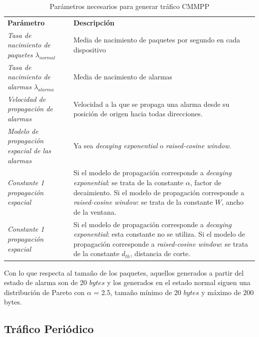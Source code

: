 \begin{table}
    \caption{Parámetros necesarios para generar tráfico CMMPP}
    \label{tab:ParametrosTraficoCMMPP}
    \centering
    \begin{tabular}{|m{6cm}|p{10cm}|} \\ 
    \textbf{Parámetro} & \textbf{Descripción} \\ 
    \textit{Tasa de nacimiento de paquetes $\lambda_{normal}$}  & \footnotesize{ Media de nacimiento de paquetes por segundo en cada dispositivo } \\ \hline 
    \textit{Tasa de nacimiento de alarmas $\lambda_{alarma}$}  & \footnotesize{ Media de nacimiento de alarmas } \\ \hline 
    \textit{Velocidad de propagación de alarmas}  & \footnotesize{ Velocidad a la que se propaga una alarma desde su posición de origen hacia todas direcciones. } \\ \hline 
    \textit{Modelo de propagación espacial de las alarmas} & \footnotesize{ Ya sea \textit{decaying exponential} o \textit{raised-cosine window}. } \\ \hline 
    \textit{Constante 1 propagación espacial} & \footnotesize{ Si el modelo de propagación corresponde a \textit{decaying exponential}:
    se trata de la constante $\alpha$, factor de decaimiento.
    Si el modelo de propagación corresponde a \textit{raised-cosine window}:
    se trata de la constante $W$, ancho de la ventana. } \\ \hline 
    \textit{Constante 1 propagación espacial} & \footnotesize{ Si el modelo de propagación corresponde a \textit{decaying exponential}:
    esta constante no se utiliza.
    Si el modelo de propagación corresponde a \textit{raised-cosine window}:
    se trata de la constante $d_{th}$, distancia de corte. } \\ \hline 
    \end{tabular}
\end{table}

    Con lo que respecta al tamaño de los paquetes, aquellos generados a partir del estado de alarma son de 20 $bytes$ y los generados en el estado normal siguen una distribución de Pareto con $\alpha$ = 2.5, tamaño mínimo de 20 $bytes$ y máximo de $200$ bytes.\newline

\subsection{Tráfico Periódico}

